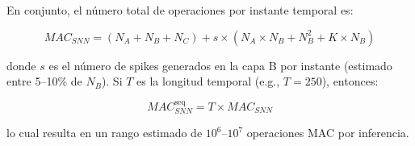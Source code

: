 En conjunto, el número total de operaciones por instante temporal es:

\begin{equation}
    MAC_{SNN} = (N_A + N_B + N_C) + s \times (N_A \times N_B + N_B^2 + K \times N_B)
\end{equation}

donde $s$ es el número de spikes generados en la capa B por instante (estimado entre 5--10\% de $N_B$). Si $T$ es la longitud temporal (e.g., $T = 250$), entonces:

\begin{equation}
    MAC^{\text{seq}}_{SNN} = T \times MAC_{SNN}
\end{equation}

lo cual resulta en un rango estimado de $10^6$--$10^7$ operaciones MAC por inferencia.